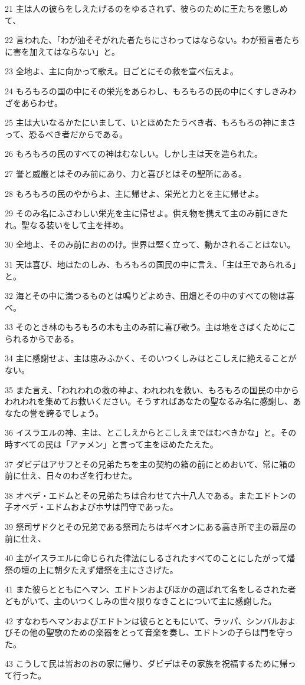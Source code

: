 \par 21 主は人の彼らをしえたげるのをゆるされず、彼らのために王たちを懲しめて、
\par 22 言われた、「わが油そそがれた者たちにさわってはならない。わが預言者たちに害を加えてはならない」と。
\par 23 全地よ、主に向かって歌え。日ごとにその救を宣べ伝えよ。
\par 24 もろもろの国の中にその栄光をあらわし、もろもろの民の中にくすしきみわざをあらわせ。
\par 25 主は大いなるかたにいまして、いとほめたたうべき者、もろもろの神にまさって、恐るべき者だからである。
\par 26 もろもろの民のすべての神はむなしい。しかし主は天を造られた。
\par 27 誉と威厳とはそのみ前にあり、力と喜びとはその聖所にある。
\par 28 もろもろの民のやからよ、主に帰せよ、栄光と力とを主に帰せよ。
\par 29 そのみ名にふさわしい栄光を主に帰せよ。供え物を携えて主のみ前にきたれ。聖なる装いをして主を拝め。
\par 30 全地よ、そのみ前におののけ。世界は堅く立って、動かされることはない。
\par 31 天は喜び、地はたのしみ、もろもろの国民の中に言え、「主は王であられる」と。
\par 32 海とその中に満つるものとは鳴りどよめき、田畑とその中のすべての物は喜べ。
\par 33 そのとき林のもろもろの木も主のみ前に喜び歌う。主は地をさばくためにこられるからである。
\par 34 主に感謝せよ、主は恵みふかく、そのいつくしみはとこしえに絶えることがない。
\par 35 また言え、「われわれの救の神よ、われわれを救い、もろもろの国民の中からわれわれを集めてお救いください。そうすればあなたの聖なるみ名に感謝し、あなたの誉を誇るでしょう。
\par 36 イスラエルの神、主は、とこしえからとこしえまでほむべきかな」と。その時すべての民は「アァメン」と言って主をほめたたえた。
\par 37 ダビデはアサフとその兄弟たちを主の契約の箱の前にとめおいて、常に箱の前に仕え、日々のわざを行わせた。
\par 38 オベデ・エドムとその兄弟たちは合わせて六十八人である。またエドトンの子オベデ・エドムおよびホサは門守であった。
\par 39 祭司ザドクとその兄弟である祭司たちはギベオンにある高き所で主の幕屋の前に仕え、
\par 40 主がイスラエルに命じられた律法にしるされたすべてのことにしたがって燔祭の壇の上に朝夕たえず燔祭を主にささげた。
\par 41 また彼らとともにヘマン、エドトンおよびほかの選ばれて名をしるされた者どもがいて、主のいつくしみの世々限りなきことについて主に感謝した。
\par 42 すなわちヘマンおよびエドトンは彼らとともにいて、ラッパ、シンバルおよびその他の聖歌のための楽器をとって音楽を奏し、エドトンの子らは門を守った。
\par 43 こうして民は皆おのおの家に帰り、ダビデはその家族を祝福するために帰って行った。

